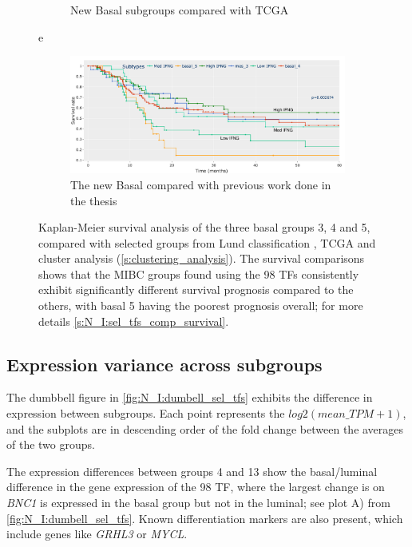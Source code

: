 \begin{figure}[!htb]
\begin{subfigure}[!t]{1.0\textwidth}
        \caption{New Basal subgroups compared with TCGA}
        \label{fig:N_I:sel_tfs_comp_tcga}
    \end{subfigure}e
    \begin{subfigure}[!t]{1.0\textwidth}
        \includegraphics[width=1.0\textwidth,keepaspectratio]{Sections/Network_I/Resources/selective_pruning/sel_tfs/comp_leiden_survival_CA.png}
        \caption{The new Basal compared with previous work done in the thesis}
        \label{fig:N_I:sel_tfs_comp_CA}
    \end{subfigure}
    \caption[Survival comparison with TCGA, Lund and CA]{Kaplan-Meier survival analysis of the three basal groups 3, 4 and 5, compared with selected groups from Lund classification \citep{Marzouka2018-ge}, TCGA \citep{Robertson2017-mg} and cluster analysis (\cref{s:clustering_analysis}). The survival comparisons shows that the MIBC groups found using the 98 TFs consistently exhibit significantly different survival prognosis compared to the others, with basal 5 having the poorest prognosis overall; for more details \cref{s:N_I:sel_tfs_comp_survival}.}
    \label{fig:N_I:sel_tfs_cs_comp}
\end{figure}

\subsection{Expression variance across subgroups} \label{s:N_I:sel_tfs_ge}

The dumbbell figure in \cref{fig:N_I:dumbell_sel_tfs} exhibits the difference in expression between subgroups. Each point represents the $log2(mean\_TPM+1)$, and the subplots are in descending order of the fold change between the averages of the two groups.

The expression differences between groups 4 and 13 show the basal/luminal difference in the gene expression of the 98 TF, where the largest change is on \textit{BNC1} is expressed in the basal group but not in the luminal; see plot A) from \cref{fig:N_I:dumbell_sel_tfs}. Known differentiation markers are also present, which include genes like \textit{GRHL3} \citep{Ramal2024-ha} or \textit{MYCL}.

